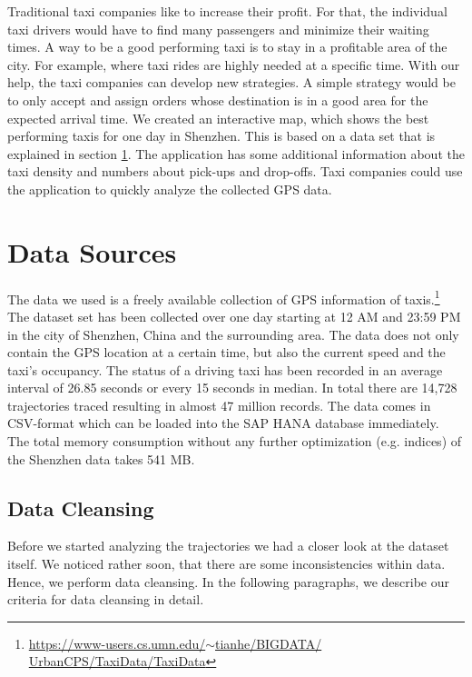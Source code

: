 \documentclass[10pt]{sig-alternate}
\begin{document}
Traditional taxi companies like to increase their profit. For that, the individual taxi drivers would have to find many passengers and minimize their waiting times. A way to be a  good performing taxi is to stay in a profitable area of the city. For example, where taxi rides are highly needed at a specific time. With our help, the taxi companies can develop new strategies. A simple strategy would be to only accept and assign orders whose destination is in a good area for the expected arrival time. We created an interactive map, which shows the best performing taxis for one day in Shenzhen. This is based on a data set that is explained in section \ref{sec:ds}. The application has some additional information about the taxi density and numbers about pick-ups and drop-offs. Taxi companies could use the application to quickly analyze the collected GPS data.\\

\section{Data Sources}
\label{sec:ds}

The data we used is a freely available collection of GPS information of taxis.\footnote{\href{https://www-users.cs.umn.edu/~tianhe/BIGDATA/UrbanCPS/TaxiData/TaxiData}{https://www-users.cs.umn.edu/$\sim$tianhe/BIGDATA/\\UrbanCPS/TaxiData/TaxiData}} The dataset set has been collected over one day starting at 12 AM and 23:59 PM in the city of Shenzhen, China and the surrounding area. The data does not only contain the GPS location at a certain time, but also the current speed and the taxi's occupancy. The status of a driving taxi has been recorded in an average interval of 26.85 seconds or every 15 seconds in median. In total there are 14,728 trajectories traced resulting in almost 47 million records. The data comes in CSV-format which can be loaded into the SAP HANA database immediately. The total memory consumption without any further optimization (e.g. indices) of the Shenzhen data takes 541 MB.

\subsection{Data Cleansing}
Before we started analyzing the trajectories we had a closer look at the dataset itself. We noticed rather soon, that there are some inconsistencies within data. Hence, we perform data cleansing. In the following paragraphs, we describe our criteria for data cleansing in detail.
\end{document}
